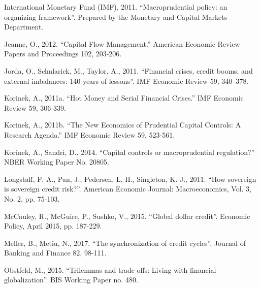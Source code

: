 \documentclass[12pt,a4paper]{article}
\begin{document}
International Monetary Fund (IMF), 2011. “Macroprudential policy: an organizing framework”. Prepared by the Monetary and Capital Markets Department.

Jeanne, O., 2012. “Capital Flow Management.” American Economic Review Papers and Proceedings 102, 203-206.

Jorda, O., Schularick, M., Taylor, A., 2011. “Financial crises, credit booms, and external imbalances: 140 years of lessons”. IMF Economic Review 59, 340–378.


Korinek, A., 2011a. “Hot Money and Serial Financial Crises.” IMF Economic Review 59, 306-339.

Korinek, A., 2011b. “The New Economics of Prudential Capital Controls: A Research Agenda.” IMF Economic Review 59, 523-561.

Korinek, A., Sandri, D., 2014. “Capital controls or macroprudential regulation?” NBER Working Paper No. 20805.

Longstaff, F. A., Pan, J., Pedersen, L. H., Singleton, K. J., 2011. “How sovereign is sovereign credit risk?”. American Economic Journal: Macroeconomics, Vol. 3, No. 2, pp. 75-103.

McCauley, R., McGuire, P., Sushko, V., 2015. “Global dollar credit”. Economic Policy, April 2015, pp. 187-229.


Meller, B., Metiu, N., 2017. “The synchronization of credit cycles”. Journal of Banking and Finance 82, 98-111.


Obstfeld, M., 2015. “Trilemmas and trade offs: Living with financial globalization”. BIS Working Paper no. 480. 


\end{document}
